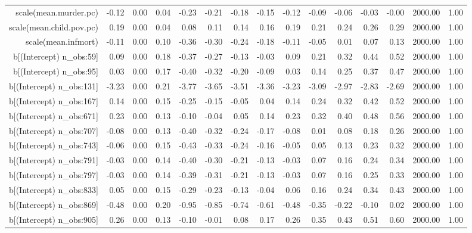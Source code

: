 \begin{table}[ht]
\begin{tabular}{rrrrrrrrrrrrrrr}
  scale(mean.murder.pc) & -0.12 & 0.00 & 0.04 & -0.23 & -0.21 & -0.18 & -0.15 & -0.12 & -0.09 & -0.06 & -0.03 & -0.00 & 2000.00 & 1.00 \\ 
  scale(mean.child.pov.pc) & 0.19 & 0.00 & 0.04 & 0.08 & 0.11 & 0.14 & 0.16 & 0.19 & 0.21 & 0.24 & 0.26 & 0.29 & 2000.00 & 1.00 \\ 
  scale(mean.infmort) & -0.11 & 0.00 & 0.10 & -0.36 & -0.30 & -0.24 & -0.18 & -0.11 & -0.05 & 0.01 & 0.07 & 0.13 & 2000.00 & 1.00 \\ 
  b[(Intercept) n\_obs:59] & 0.09 & 0.00 & 0.18 & -0.37 & -0.27 & -0.13 & -0.03 & 0.09 & 0.21 & 0.32 & 0.44 & 0.52 & 2000.00 & 1.00 \\ 
  b[(Intercept) n\_obs:95] & 0.03 & 0.00 & 0.17 & -0.40 & -0.32 & -0.20 & -0.09 & 0.03 & 0.14 & 0.25 & 0.37 & 0.47 & 2000.00 & 1.00 \\ 
  b[(Intercept) n\_obs:131] & -3.23 & 0.00 & 0.21 & -3.77 & -3.65 & -3.51 & -3.36 & -3.23 & -3.09 & -2.97 & -2.83 & -2.69 & 2000.00 & 1.00 \\ 
  b[(Intercept) n\_obs:167] & 0.14 & 0.00 & 0.15 & -0.25 & -0.15 & -0.05 & 0.04 & 0.14 & 0.24 & 0.32 & 0.42 & 0.52 & 2000.00 & 1.00 \\ 
  b[(Intercept) n\_obs:671] & 0.23 & 0.00 & 0.13 & -0.10 & -0.04 & 0.05 & 0.14 & 0.23 & 0.32 & 0.40 & 0.48 & 0.56 & 2000.00 & 1.00 \\ 
  b[(Intercept) n\_obs:707] & -0.08 & 0.00 & 0.13 & -0.40 & -0.32 & -0.24 & -0.17 & -0.08 & 0.01 & 0.08 & 0.18 & 0.26 & 2000.00 & 1.00 \\ 
  b[(Intercept) n\_obs:743] & -0.06 & 0.00 & 0.15 & -0.43 & -0.33 & -0.24 & -0.16 & -0.05 & 0.05 & 0.13 & 0.23 & 0.32 & 2000.00 & 1.00 \\ 
  b[(Intercept) n\_obs:791] & -0.03 & 0.00 & 0.14 & -0.40 & -0.30 & -0.21 & -0.13 & -0.03 & 0.07 & 0.16 & 0.24 & 0.34 & 2000.00 & 1.00 \\ 
  b[(Intercept) n\_obs:797] & -0.03 & 0.00 & 0.14 & -0.39 & -0.31 & -0.21 & -0.13 & -0.03 & 0.07 & 0.16 & 0.25 & 0.33 & 2000.00 & 1.00 \\ 
  b[(Intercept) n\_obs:833] & 0.05 & 0.00 & 0.15 & -0.29 & -0.23 & -0.13 & -0.04 & 0.06 & 0.16 & 0.24 & 0.34 & 0.43 & 2000.00 & 1.00 \\ 
  b[(Intercept) n\_obs:869] & -0.48 & 0.00 & 0.20 & -0.95 & -0.85 & -0.74 & -0.61 & -0.48 & -0.35 & -0.22 & -0.10 & 0.02 & 2000.00 & 1.00 \\ 
  b[(Intercept) n\_obs:905] & 0.26 & 0.00 & 0.13 & -0.10 & -0.01 & 0.08 & 0.17 & 0.26 & 0.35 & 0.43 & 0.51 & 0.60 & 2000.00 & 1.00 \\ 

\end{tabular}
\end{table}
